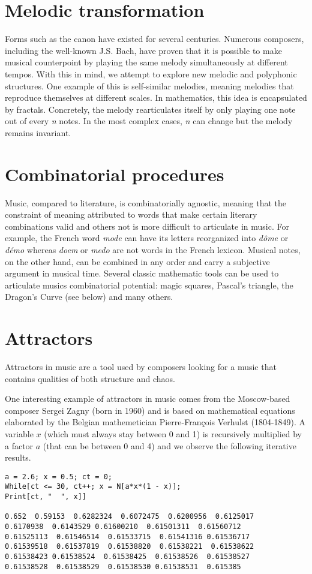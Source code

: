 \documentclass{article}
\begin{document}
\section*{Melodic transformation}
Forms such as the canon have existed for several centuries.  Numerous
composers, including the well-known J.S. Bach, have proven that it is
possible to make musical counterpoint by playing the same melody
simultaneously at different tempos.  With this in mind, we attempt to
explore new melodic and polyphonic structures.  One example of this is
self-similar melodies, meaning melodies that reproduce themselves at
different scales.  In mathematics, this idea is encapsulated by fractals. 
Concretely, the melody rearticulates itself by only playing one note out of
every \emph{n} notes.  In the most complex cases, \emph{n} can change but
the melody remains invariant.
\section*{Combinatorial procedures}
Music, compared to literature, is combinatorially agnostic, meaning that
the constraint of meaning attributed to words that make certain literary
combinations valid and others not is more difficult to articulate in music. 
For example, the French word \emph{mode} can have its letters reorganized
into \emph{d\^{o}me} or \emph{d\'{e}mo} whereas \emph{doem} or \emph{medo}
are not words in the French lexicon.  Musical notes, on the other hand, can
be combined in any order and carry a subjective argument in musical time.
Several classic mathematic tools can be used to articulate musics
combinatorial potential: magic squares, Pascal's triangle, the Dragon's
Curve (see below) and many others.
\section*{Attractors}
Attractors in music are a tool used by composers looking for a music that
contains qualities of both structure and chaos.

One interesting example of attractors in music comes from the Moscow-based
composer Sergei Zagny (born in 1960) and is based on mathematical equations
elaborated by the Belgian mathemetician Pierre-Fran\c{c}ois Verhulst
(1804-1849). A variable $x$ (which must always stay between 0 and 1) is
recursively multiplied by a factor $a$ (that can be between 0 and 4) and we
observe the following iterative results.

\begin{lstlisting}
a = 2.6; x = 0.5; ct = 0;
While[ct <= 30, ct++; x = N[a*x*(1 - x)];
Print[ct, "  ", x]]

0.652  0.59153  0.6282324  0.6072475  0.6200956  0.6125017
0.6170938  0.6143529 0.61600210  0.61501311  0.61560712 
0.61525113  0.61546514  0.61533715  0.61541316 0.61536717
0.61539518  0.61537819  0.61538820  0.61538221  0.61538622
0.61538423 0.61538524  0.61538425  0.61538526  0.61538527
0.61538528  0.61538529  0.61538530 0.61538531  0.615385
\end{lstlisting}
\end{document}
